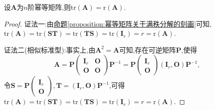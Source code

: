 \documentclass[../../main.tex]{subfiles}
\begin{document}
\begin{corollary}[幂等矩阵的迹和秩相等]\label{corollary:幂等矩阵的迹和秩相等}
设\(\boldsymbol{A}\)为\(n\)阶幂等矩阵,则\(\mathrm{tr}(\boldsymbol{A})=\mathrm{r}(\boldsymbol{A})\).
\end{corollary}
\begin{proof}
{\color{blue}证法一:}由\hyperref[proposition:幂等矩阵关于满秩分解的刻画]{命题\ref{proposition:幂等矩阵关于满秩分解的刻画}}可知,\(\mathrm{tr}(\boldsymbol{A})=\mathrm{tr}(\boldsymbol{S}\boldsymbol{T})=\mathrm{tr}(\boldsymbol{T}\boldsymbol{S})=\mathrm{tr}(\boldsymbol{I}_r)=r=\mathrm{r}(\boldsymbol{A})\).

{\color{blue}证法二(相似标准型):}事实上,由\(\boldsymbol{A}^2=\boldsymbol{A}\)可知,存在可逆矩阵\(\boldsymbol{P}\),使得
\[
\boldsymbol{A}=\boldsymbol{P}\begin{pmatrix}
\boldsymbol{I}_r&\boldsymbol{O}\\
\boldsymbol{O}&\boldsymbol{O}
\end{pmatrix}\boldsymbol{P}^{-1}=\boldsymbol{P}\begin{pmatrix}
\boldsymbol{I}_r\\
\boldsymbol{O}
\end{pmatrix}(\boldsymbol{I}_r,\boldsymbol{O})\boldsymbol{P}^{-1},
\]
令\(\boldsymbol{S}=\boldsymbol{P}\begin{pmatrix}
\boldsymbol{I}_r\\
\boldsymbol{O}
\end{pmatrix},\boldsymbol{T}=(\boldsymbol{I}_r,\boldsymbol{O})\boldsymbol{P}^{-1}\),可得\(\mathrm{tr}(\boldsymbol{A})=\mathrm{tr}(\boldsymbol{S}\boldsymbol{T})=\mathrm{tr}(\boldsymbol{T}\boldsymbol{S})=\mathrm{tr}(\boldsymbol{I}_r)=r=\mathrm{r}(\boldsymbol{A})\).

\end{proof}
\end{document}
